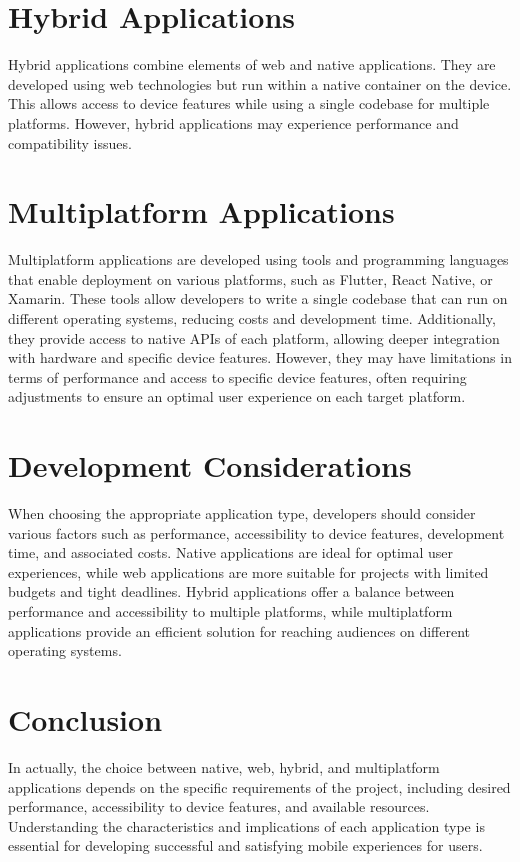 \documentclass{IEEEtran}
\begin{document}
\section{Hybrid Applications}
Hybrid applications combine elements of web and native applications. They are developed using web technologies but run within a native container on the device. This allows access to device features while using a single codebase for multiple platforms. However, hybrid applications may experience performance and compatibility issues.

\section{Multiplatform Applications}
Multiplatform applications are developed using tools and programming languages that enable deployment on various platforms, such as Flutter, React Native, or Xamarin. These tools allow developers to write a single codebase that can run on different operating systems, reducing costs and development time. Additionally, they provide access to native APIs of each platform, allowing deeper integration with hardware and specific device features. However, they may have limitations in terms of performance and access to specific device features, often requiring adjustments to ensure an optimal user experience on each target platform.

\section{Development Considerations}
When choosing the appropriate application type, developers should consider various factors such as performance, accessibility to device features, development time, and associated costs. Native applications are ideal for optimal user experiences, while web applications are more suitable for projects with limited budgets and tight deadlines. Hybrid applications offer a balance between performance and accessibility to multiple platforms, while multiplatform applications provide an efficient solution for reaching audiences on different operating systems.

\section{Conclusion}
In actually, the choice between native, web, hybrid, and multiplatform applications depends on the specific requirements of the project, including desired performance, accessibility to device features, and available resources. Understanding the characteristics and implications of each application type is essential for developing successful and satisfying mobile experiences for users.
\end{document}

